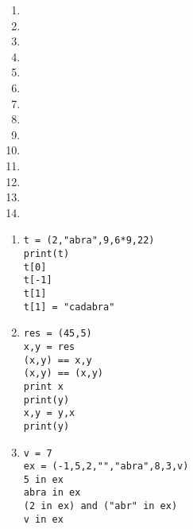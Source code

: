 
\begin{multicols}{3}
  \begin{enumerate}[label=\emph{\alph*)}]
    \item {}
    \item {}
    \item {}
    \item \pyv{(,)}
    \item \pyv{()}
    \item \pyv{()+()}
    \item \pyv{()+() == ()}
    \item {}
    \item {}
    \item {}
    \item {}
    \item {}
    \item {}
    \item {}
  \end{enumerate}
\end{multicols}





\begin{enumerate}[label=\emph{\alph*)}]
\item 
\begin{lstlisting}
t = (2,"abra",9,6*9,22)
print(t)
t[0]
t[-1]
t[1]
t[1] = "cadabra" 
\end{lstlisting}
\end{enumerate}
\begin{enumerate}[label=\emph{\alph*)}]
\setcounter{enumi}{1}
\item 
\begin{lstlisting}
res = (45,5)
x,y = res
(x,y) == x,y
(x,y) == (x,y)
print x
print(y)
x,y = y,x
print(y)
\end{lstlisting}
\end{enumerate}
\begin{enumerate}[label=\emph{\alph*)}]
\setcounter{enumi}{2}
\item 
\begin{lstlisting}
v = 7
ex = (-1,5,2,"","abra",8,3,v)
5 in ex
abra in ex
(2 in ex) and ("abr" in ex)
v in ex
\end{lstlisting}
\end{enumerate}

